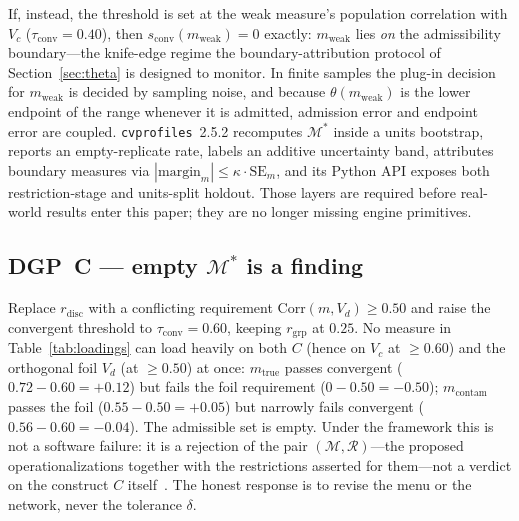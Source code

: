\documentclass[10pt,letterpaper]{article}
\newcommand{\cvp}{\texttt{cvprofiles}}
\newcommand{\M}{\ensuremath{\mathcal{M}}}
\newcommand{\Rset}{\mathcal{R}}
\begin{document}
If, instead, the threshold is set at the weak measure's population correlation with $V_{\!c}$ ($\tau_{\mathrm{conv}}=0.40$), then $s_{\mathrm{conv}}(m_{\mathrm{weak}})=0$ exactly: $m_{\mathrm{weak}}$ lies \emph{on} the admissibility boundary---the knife-edge regime the boundary-attribution protocol of Section~\ref{sec:theta} is designed to monitor.
In finite samples the plug-in decision for $m_{\mathrm{weak}}$ is decided by sampling noise, and because $\theta(m_{\mathrm{weak}})$ is the lower endpoint of the range whenever it is admitted, admission error and endpoint error are coupled.
\cvp{}~2.5.2 recomputes $\M^*$ inside a units bootstrap, reports an empty-replicate rate, labels an additive uncertainty band, attributes boundary measures via $|\mathrm{margin}_m|\le\kappa\cdot\mathrm{SE}_m$, and its Python API exposes both restriction-stage and units-split holdout.
Those layers are required before real-world results enter this paper; they are no longer missing engine primitives.

\subsection{DGP~C --- empty $\M^*$ is a finding}
Replace $r_{\mathrm{disc}}$ with a conflicting requirement $\mathrm{Corr}(m,V_{\!d})\ge 0.50$ and raise the convergent threshold to $\tau_{\mathrm{conv}}=0.60$, keeping $r_{\mathrm{grp}}$ at $0.25$.
No measure in Table~\ref{tab:loadings} can load heavily on both $C$ (hence on $V_{\!c}$ at $\ge 0.60$) and the orthogonal foil $V_{\!d}$ (at $\ge 0.50$) at once: $m_{\mathrm{true}}$ passes convergent ($0.72-0.60=+0.12$) but fails the foil requirement ($0-0.50=-0.50$); $m_{\mathrm{contam}}$ passes the foil ($0.55-0.50=+0.05$) but narrowly fails convergent ($0.56-0.60=-0.04$).
The admissible set is empty.
Under the framework this is not a software failure: it is a rejection of the pair $(\M,\Rset)$---the proposed operationalizations together with the restrictions asserted for them---not a verdict on the construct $C$ itself~\cite{cvprofiles}.
The honest response is to revise the menu or the network, never the tolerance $\delta$.
\end{document}
